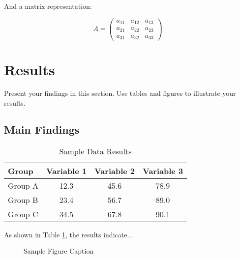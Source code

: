 \documentclass[12pt,a4paper,twoside]{article}
\begin{document}
And a matrix representation:

\begin{equation}
    \label{eq:matrix}
    A = \begin{pmatrix}
        a_{11} & a_{12} & a_{13} \\
        a_{21} & a_{22} & a_{23} \\
        a_{31} & a_{32} & a_{33}
    \end{pmatrix}
\end{equation}

\section{Results}
\label{sec:results}

Present your findings in this section. Use tables and figures to illustrate your results.

\subsection{Main Findings}
\label{subsec:main_findings}

\lipsum[6] %

\begin{table}[htbp]
    \centering
    \caption{Sample Data Results}
    \label{tab:sample_data}
    \begin{tabular}{lccc}
        \toprule
        \textbf{Group} & \textbf{Variable 1} & \textbf{Variable 2} & \textbf{Variable 3} \\
        \midrule
        Group A & 12.3 & 45.6 & 78.9 \\
        Group B & 23.4 & 56.7 & 89.0 \\
        Group C & 34.5 & 67.8 & 90.1 \\
        \bottomrule
    \end{tabular}
\end{table}

As shown in Table \ref{tab:sample_data}, the results indicate...

\begin{figure}[htbp]
    \centering
    \caption{Sample Figure Caption}
    \label{fig:sample_figure}
\end{figure}
\end{document}
